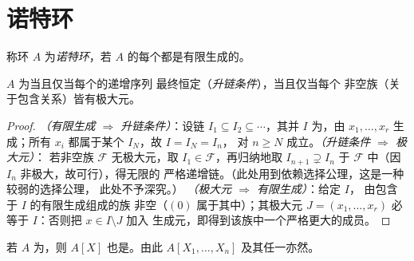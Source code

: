 \section{诺特环}

\begin{definition}\label{def:b3:rings:noetherian}
称环 $A$ 为\emph{诺特环}，若
$A$ 的每个都是有限生成的。
\end{definition}

\begin{proposition}\label{prop:b3:rings:noethacc}
$A$ 为当且仅当每个的递增序列
最终恒定（\emph{升链条件}），当且仅当每个
非空族（关于包含关系）皆有极大元。
\end{proposition}

\begin{proof}
\emph{（有限生成 $\Rightarrow$ 升链条件）}：设链 $I_1 \subseteq I_2
\subseteq \cdots$，其并 $I$ 为，由 $x_1,
\dots, x_r$ 生成；所有 $x_i$ 都属于某个 $I_N$，故 $I = I_N = I_n$，
对 $n \geq N$ 成立。\emph{（升链条件 $\Rightarrow$ 极大元）}：
若非空族 $\mathcal F$ 无极大元，取 $I_1 \in
\mathcal F$，再归纳地取 $I_{n+1} \supsetneq I_n$ 于
$\mathcal F$ 中（因 $I_n$ 非极大，故可行），得无限的
严格递增链。（此处用到依赖选择公理，这是一种较弱的选择公理，
此处不予深究。）
\emph{（极大元 $\Rightarrow$ 有限生成）}：给定 $I$，
由包含于 $I$ 的有限生成组成的族
非空（$(0)$ 属于其中）；其极大元 $J = (x_1, \dots, x_r)$ 必
等于 $I$：否则把 $x \in I \setminus J$ 加入
生成元，即得到该族中一个严格更大的成员。
\end{proof}

\begin{theorem}[希尔伯特基定理]\label{thm:b3:rings:hilbert}
若 $A$ 为，则 $A[X]$ 也是。由此 $A[X_1, \dots,
X_n]$ 及其任一亦然。
\end{theorem}

